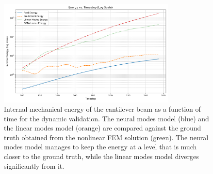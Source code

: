 \begin{figure}[htb]
    \centering
    \includegraphics[width=0.8\textwidth]{Images/beam_dynamic_energy.png}
    \caption{Internal mechanical energy of the cantilever beam as a function of time for the dynamic validation. The neural modes model (blue) and the linear modes model (orange) are compared against the ground truth obtained from the nonlinear FEM solution (green). The neural modes model manages to keep the energy at a level that is much closer to the ground truth, while the linear modes model diverges significantly from it.}
    \label{fig:dynamic_validation_energy_comparison}
    \end{figure}




\FloatBarrier %